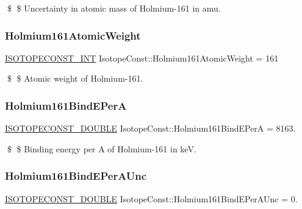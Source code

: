 \$ \$ Uncertainty in atomic mass of Holmium-\/161 in amu. \mbox{\label{group___isotope_const-_holmium-_ho161_ga7f61487ece37067fc2e34b3e768b1d4e}} 
\subsubsection{\texorpdfstring{Holmium161\+Atomic\+Weight}{Holmium161AtomicWeight}}
{\footnotesize\ttfamily \mbox{\hyperlink{group___isotope_const-_macros_ga5f18360b3e99483a35c32d789e62621c}{I\+S\+O\+T\+O\+P\+E\+C\+O\+N\+S\+T\+\_\+\+I\+NT}} Isotope\+Const\+::\+Holmium161\+Atomic\+Weight = 161}

\$ \$ Atomic weight of Holmium-\/161. \mbox{\label{group___isotope_const-_holmium-_ho161_ga5f3db0c27202ae32cfc5f7d068569dcd}} 
\subsubsection{\texorpdfstring{Holmium161\+Bind\+E\+PerA}{Holmium161BindEPerA}}
{\footnotesize\ttfamily \mbox{\hyperlink{group___isotope_const-_macros_ga8f45a7272ce02c0b4c65c44636ed719a}{I\+S\+O\+T\+O\+P\+E\+C\+O\+N\+S\+T\+\_\+\+D\+O\+U\+B\+LE}} Isotope\+Const\+::\+Holmium161\+Bind\+E\+PerA = 8163.}

\$ \$ Binding energy per A of Holmium-\/161 in keV. \mbox{\label{group___isotope_const-_holmium-_ho161_gae8f9ec42c66d3a21812a77b0a702b6ad}} 
\subsubsection{\texorpdfstring{Holmium161\+Bind\+E\+Per\+A\+Unc}{Holmium161BindEPerAUnc}}
{\footnotesize\ttfamily \mbox{\hyperlink{group___isotope_const-_macros_ga8f45a7272ce02c0b4c65c44636ed719a}{I\+S\+O\+T\+O\+P\+E\+C\+O\+N\+S\+T\+\_\+\+D\+O\+U\+B\+LE}} Isotope\+Const\+::\+Holmium161\+Bind\+E\+Per\+A\+Unc = 0.}

